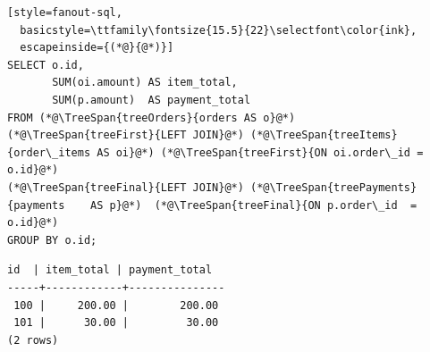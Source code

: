 \documentclass[12pt]{article}
\begin{document}
\begingroup
{}
\newcommand{\TreeSpan}[2]{\begingroup\setlength{\fboxsep}{.35mm}%
  \colorbox{#1!13}{\textcolor{#1}{\strut #2}}\endgroup}
\newsavebox{\fanoutTreeQuery}
\begin{lrbox}{\fanoutTreeQuery}\begin{minipage}{140mm}
\begin{lstlisting}[style=fanout-sql,
  basicstyle=\ttfamily\fontsize{15.5}{22}\selectfont\color{ink},
  escapeinside={(*@}{@*)}]
SELECT o.id,
       SUM(oi.amount) AS item_total,
       SUM(p.amount)  AS payment_total
FROM (*@\TreeSpan{treeOrders}{orders AS o}@*)
(*@\TreeSpan{treeFirst}{LEFT JOIN}@*) (*@\TreeSpan{treeItems}{order\_items AS oi}@*) (*@\TreeSpan{treeFirst}{ON oi.order\_id = o.id}@*)
(*@\TreeSpan{treeFinal}{LEFT JOIN}@*) (*@\TreeSpan{treePayments}{payments    AS p}@*)  (*@\TreeSpan{treeFinal}{ON p.order\_id  = o.id}@*)
GROUP BY o.id;
\end{lstlisting}
\end{minipage}\end{lrbox}
\newsavebox{\fanoutTreeResult}
\begin{lrbox}{\fanoutTreeResult}\begin{minipage}{136mm}
\begin{lstlisting}[style=fanout-mono,
  basicstyle=\ttfamily\fontsize{15.5}{20.5}\selectfont\color{ink}]
 id  | item_total | payment_total
-----+------------+---------------
 100 |     200.00 |        200.00
 101 |      30.00 |         30.00
(2 rows)
\end{lstlisting}
\end{minipage}\end{lrbox}
\end{document}
